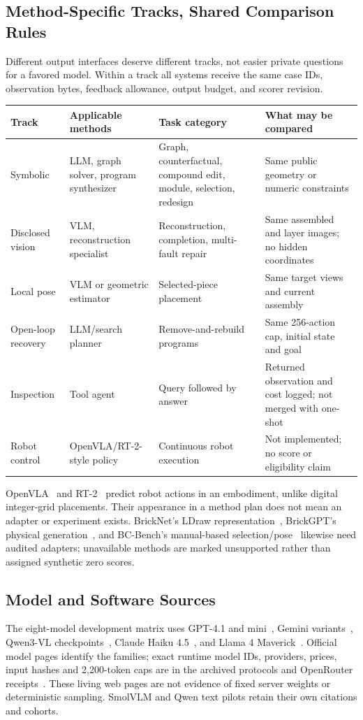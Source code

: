 \subsection{Method-Specific Tracks, Shared Comparison Rules}
Different output interfaces deserve different tracks, not easier private questions
for a favored model. Within a track all systems receive the same case IDs, observation
bytes, feedback allowance, output budget, and scorer revision.
\begin{tabularx}{\textwidth}{@{}lXXX@{}}
\toprule
Track & Applicable methods & Task category & What may be compared\\
\midrule
Symbolic & LLM, graph solver, program synthesizer & Graph, counterfactual, compound edit, module, selection, redesign & Same public geometry or numeric constraints\\
Disclosed vision & VLM, reconstruction specialist & Reconstruction, completion, multi-fault repair & Same assembled and layer images; no hidden coordinates\\
Local pose & VLM or geometric estimator & Selected-piece placement & Same target views and current assembly\\
Open-loop recovery & LLM/search planner & Remove-and-rebuild programs & Same 256-action cap, initial state and goal\\
Inspection & Tool agent & Query followed by answer & Returned observation and cost logged; not merged with one-shot\\
Robot control & OpenVLA/RT-2-style policy & Continuous robot execution & Not implemented; no score or eligibility claim\\
\bottomrule
\end{tabularx}
OpenVLA~\cite{kim2024openvla} and RT-2~\cite{brohan2023rt2} predict robot actions in
an embodiment, unlike digital integer-grid placements. Their appearance in a method
plan does not mean an adapter or experiment exists. BrickNet's LDraw
representation~\cite{kulits2026bricknet,ldraw}, BrickGPT's physical
generation~\cite{pun2025brickgpt}, and BC-Bench's manual-based
selection/pose~\cite{liu2026composer} likewise need audited adapters; unavailable
methods are marked unsupported rather than assigned synthetic zero scores.

\subsection{Model and Software Sources}
The eight-model development matrix uses GPT-4.1 and mini~\cite{openai2025gpt41},
Gemini variants~\cite{googlemodels}, Qwen3-VL checkpoints~\cite{qwen3vl},
Claude Haiku 4.5~\cite{anthropic2025haiku}, and Llama 4
Maverick~\cite{meta2025llama4}. Official model pages identify the families;
exact runtime model IDs, providers, prices, input hashes and 2,200-token caps are
in the archived protocols and OpenRouter receipts~\cite{openrouterapi}.
These living web pages are not evidence of fixed server weights or deterministic sampling.
SmolVLM and Qwen text pilots retain their own citations and cohorts.

